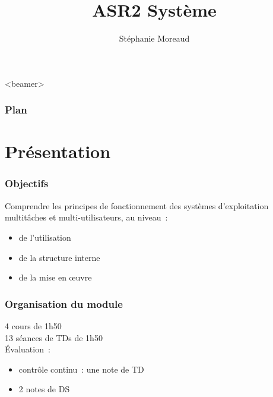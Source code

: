 \def\col{blue}

\usepackage{multicol}

\def\enseignement{ASR2 Système}
\title[]{\enseignement\\
}
\author{Stéphanie Moreaud}
\date{}





\begin{frame}
  \titlepage
\end{frame}

\begin{frame}<beamer>
  \frametitle{Plan}
  \tableofcontents[hideallsubsections]
\end{frame}


\section{Présentation}

\begin{frame}
  \frametitle{Objectifs}
  Comprendre les principes de fonctionnement des systèmes d'exploitation
  multitâches et multi-utilisateurs, au niveau~:
  \begin{itemize}
  \item de l’utilisation
  \item de la structure interne 
  \item de la mise en œuvre
  \end{itemize}
\end{frame}

\begin{frame}
\frametitle{Organisation du module}
4 cours de 1h50\\
13 séances de TDs de 1h50\\
\vspace{0.5cm}
Évaluation~:
\begin{itemize}
\item contrôle continu~: une note de TD 
\item 2 notes de DS
\end{itemize}
\end{frame}

